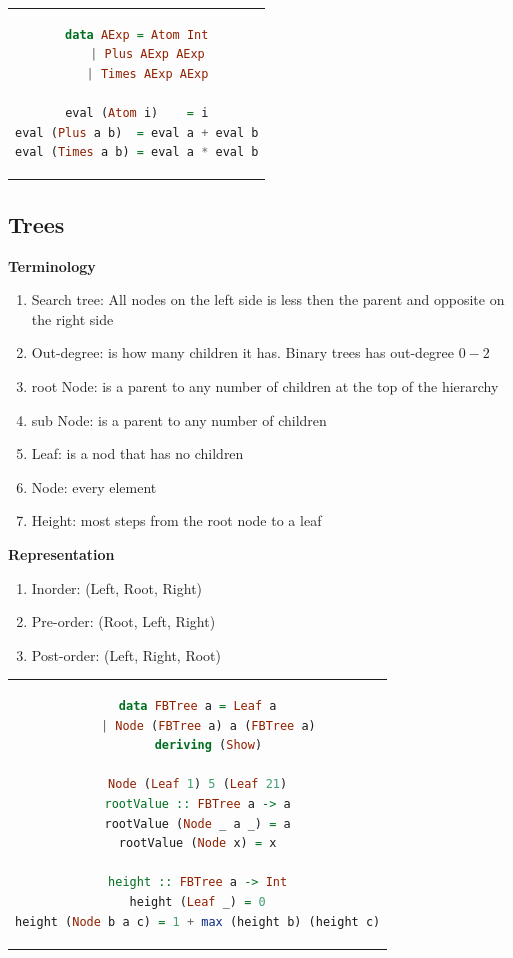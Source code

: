 \begin{center}
\begin{tabular}{c}
\begin{lstlisting}[language=Haskell]
data AExp = Atom Int
   | Plus AExp AExp
   | Times AExp AExp

eval (Atom i)    = i
eval (Plus a b)  = eval a + eval b
eval (Times a b) = eval a * eval b
\end{lstlisting}
\end{tabular}
\end{center}

\newpage

\subsection{Trees}
\noindent\textbf{Terminology}
\begin{enumerate}
\item Search tree: All nodes on the left side is less then the parent and opposite on the right side    
\item Out-degree: is how many children it has. Binary trees has out-degree $0-2$
\item root Node: is a parent to any number of children at the top of the hierarchy
\item sub Node: is a parent to any number of children
\item Leaf: is a nod that has no children
\item Node: every element
\item Height: most steps from the root node to a leaf  
\end{enumerate}

\noindent\textbf{Representation}
\begin{enumerate}
\item Inorder: (Left, Root, Right)
\item Pre-order: (Root, Left, Right)
\item Post-order: (Left, Right, Root)
\end{enumerate}

\begin{center}
\begin{tabular}{c}
\begin{lstlisting}[language=Haskell]
data FBTree a = Leaf a
   | Node (FBTree a) a (FBTree a)
   deriving (Show)
   
Node (Leaf 1) 5 (Leaf 21)
rootValue :: FBTree a -> a
rootValue (Node _ a _) = a
rootValue (Node x) = x

height :: FBTree a -> Int
height (Leaf _) = 0
height (Node b a c) = 1 + max (height b) (height c)
\end{lstlisting}
\end{tabular}
\end{center}


